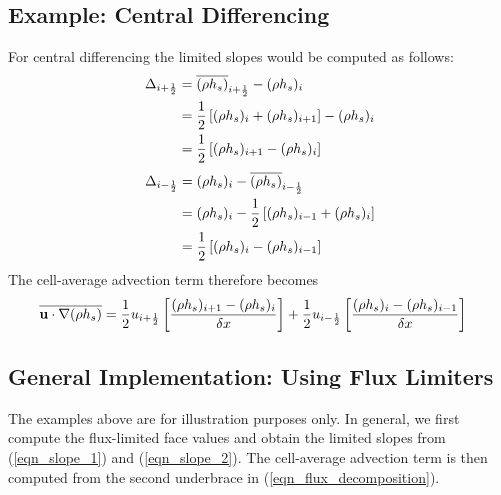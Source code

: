 \subsection{Example: Central Differencing}
For central differencing the limited slopes would be computed as follows:
\begin{align}
\Delta_{i+\mbox{\tiny $\frac{1}{2}$}} &= \overline{(\rho h_s)}_{i+\mbox{\tiny $\frac{1}{2}$}} - (\rho h_s)_i \notag\\
&= \frac{1}{2}\left[(\rho h_s)_i + (\rho h_s)_{i+1}\right] - (\rho h_s)_i \notag\\
&= \frac{1}{2}\left[(\rho h_s)_{i+1} - (\rho h_s)_i\right]
\end{align}
\begin{align}
\Delta_{i-\mbox{\tiny $\frac{1}{2}$}} &= (\rho h_s)_i - \overline{(\rho h_s)}_{i-\mbox{\tiny $\frac{1}{2}$}} \notag\\
&= (\rho h_s)_i - \frac{1}{2}\left[(\rho h_s)_{i-1} + (\rho h_s)_i\right] \notag\\
&= \frac{1}{2}\left[ (\rho h_s)_i - (\rho h_s)_{i-1} \right]
\end{align}
The cell-average advection term therefore becomes
\begin{align}
\overline{\mathbf{u}\cdot\nabla(\rho h_s)} &= \frac{1}{2}  u_{i+\mbox{\tiny $\frac{1}{2}$}} \left[ \frac{(\rho h_s)_{i+1} - (\rho h_s)_i}{\delta x}
\right] + \frac{1}{2} u_{i-\mbox{\tiny $\frac{1}{2}$}} \left[ \frac{(\rho h_s)_i - (\rho h_s)_{i-1}}{\delta x} \right]
\end{align}

\subsection{General Implementation: Using Flux Limiters}
The examples above are for illustration purposes only.  In general, we first compute the flux-limited face values and obtain the
limited slopes from (\ref{eqn_slope_1}) and (\ref{eqn_slope_2}).  The cell-average advection term is then computed from the second
underbrace in (\ref{eqn_flux_decomposition}).


